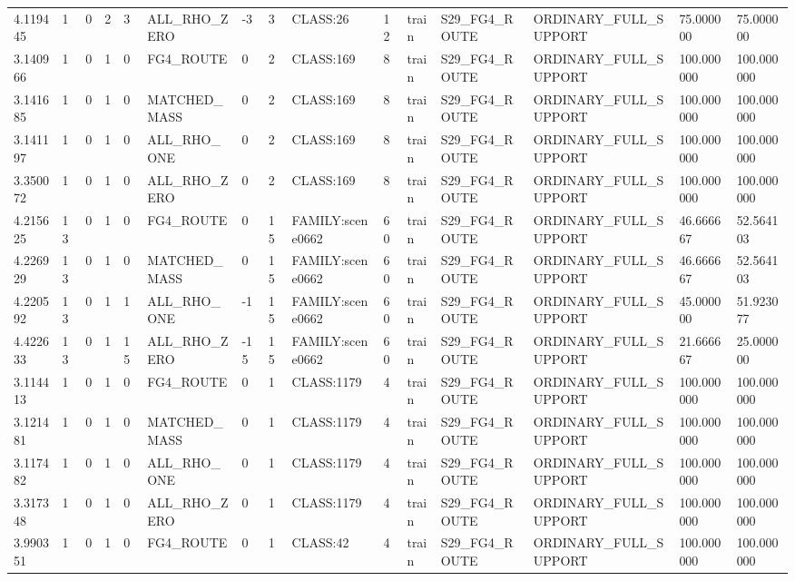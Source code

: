\begin{tabular}{lllllllllllllll}
4.119445 & 1 & 0 & 2 & 3 & ALL\_RHO\_ZERO & -3 & 3 & CLASS:26 & 12 & train & S29\_FG4\_ROUTE & ORDINARY\_FULL\_SUPPORT & 75.000000 & 75.000000 \\
3.140966 & 1 & 0 & 1 & 0 & FG4\_ROUTE & 0 & 2 & CLASS:169 & 8 & train & S29\_FG4\_ROUTE & ORDINARY\_FULL\_SUPPORT & 100.000000 & 100.000000 \\
3.141685 & 1 & 0 & 1 & 0 & MATCHED\_MASS & 0 & 2 & CLASS:169 & 8 & train & S29\_FG4\_ROUTE & ORDINARY\_FULL\_SUPPORT & 100.000000 & 100.000000 \\
3.141197 & 1 & 0 & 1 & 0 & ALL\_RHO\_ONE & 0 & 2 & CLASS:169 & 8 & train & S29\_FG4\_ROUTE & ORDINARY\_FULL\_SUPPORT & 100.000000 & 100.000000 \\
3.350072 & 1 & 0 & 1 & 0 & ALL\_RHO\_ZERO & 0 & 2 & CLASS:169 & 8 & train & S29\_FG4\_ROUTE & ORDINARY\_FULL\_SUPPORT & 100.000000 & 100.000000 \\
4.215625 & 13 & 0 & 1 & 0 & FG4\_ROUTE & 0 & 15 & FAMILY:scene0662 & 60 & train & S29\_FG4\_ROUTE & ORDINARY\_FULL\_SUPPORT & 46.666667 & 52.564103 \\
4.226929 & 13 & 0 & 1 & 0 & MATCHED\_MASS & 0 & 15 & FAMILY:scene0662 & 60 & train & S29\_FG4\_ROUTE & ORDINARY\_FULL\_SUPPORT & 46.666667 & 52.564103 \\
4.220592 & 13 & 0 & 1 & 1 & ALL\_RHO\_ONE & -1 & 15 & FAMILY:scene0662 & 60 & train & S29\_FG4\_ROUTE & ORDINARY\_FULL\_SUPPORT & 45.000000 & 51.923077 \\
4.422633 & 13 & 0 & 1 & 15 & ALL\_RHO\_ZERO & -15 & 15 & FAMILY:scene0662 & 60 & train & S29\_FG4\_ROUTE & ORDINARY\_FULL\_SUPPORT & 21.666667 & 25.000000 \\
3.114413 & 1 & 0 & 1 & 0 & FG4\_ROUTE & 0 & 1 & CLASS:1179 & 4 & train & S29\_FG4\_ROUTE & ORDINARY\_FULL\_SUPPORT & 100.000000 & 100.000000 \\
3.121481 & 1 & 0 & 1 & 0 & MATCHED\_MASS & 0 & 1 & CLASS:1179 & 4 & train & S29\_FG4\_ROUTE & ORDINARY\_FULL\_SUPPORT & 100.000000 & 100.000000 \\
3.117482 & 1 & 0 & 1 & 0 & ALL\_RHO\_ONE & 0 & 1 & CLASS:1179 & 4 & train & S29\_FG4\_ROUTE & ORDINARY\_FULL\_SUPPORT & 100.000000 & 100.000000 \\
3.317348 & 1 & 0 & 1 & 0 & ALL\_RHO\_ZERO & 0 & 1 & CLASS:1179 & 4 & train & S29\_FG4\_ROUTE & ORDINARY\_FULL\_SUPPORT & 100.000000 & 100.000000 \\
3.990351 & 1 & 0 & 1 & 0 & FG4\_ROUTE & 0 & 1 & CLASS:42 & 4 & train & S29\_FG4\_ROUTE & ORDINARY\_FULL\_SUPPORT & 100.000000 & 100.000000 \\

\end{tabular}
